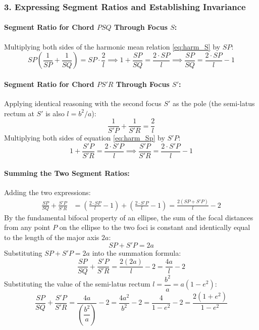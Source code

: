 \documentclass[11pt,a4paper]{article}
\begin{document}
\clearpage
\subsubsection*{3. Expressing Segment Ratios and Establishing Invariance}

\paragraph{Segment Ratio for Chord $PSQ$ Through Focus $S$:}
Multiplying both sides of the harmonic mean relation \eqref{eq:harm_S} by $SP$:
\[
SP \left(\frac{1}{SP} + \frac{1}{SQ}\right) = SP \cdot \frac{2}{l} \implies 1 + \frac{SP}{SQ} = \frac{2 \cdot SP}{l} \implies \frac{SP}{SQ} = \frac{2 \cdot SP}{l} - 1
\]

\paragraph{Segment Ratio for Chord $PS'R$ Through Focus $S'$:}
Applying identical reasoning with the second focus $S'$ as the pole (the semi-latus rectum at $S'$ is also $l = b^2/a$):
\begin{equation}\label{eq:harm_Sp}
\frac{1}{S'P} + \frac{1}{S'R} = \frac{2}{l}
\end{equation}
Multiplying both sides of equation \eqref{eq:harm_Sp} by $S'P$:
\[
1 + \frac{S'P}{S'R} = \frac{2 \cdot S'P}{l} \implies \frac{S'P}{S'R} = \frac{2 \cdot S'P}{l} - 1
\]

\paragraph{Summing the Two Segment Ratios:}
Adding the two expressions:
\begin{align*}
\frac{SP}{SQ} + \frac{S'P}{S'R} &= \left(\frac{2 \cdot SP}{l} - 1\right) + \left(\frac{2 \cdot S'P}{l} - 1\right) = \frac{2(SP + S'P)}{l} - 2
\end{align*}
By the fundamental bifocal property of an ellipse, the sum of the focal distances from any point $P$ on the ellipse to the two foci is constant and identically equal to the length of the major axis $2a$:
\[
SP + S'P = 2a
\]
Substituting $SP + S'P = 2a$ into the summation formula:
\[
\frac{SP}{SQ} + \frac{S'P}{S'R} = \frac{2(2a)}{l} - 2 = \frac{4a}{l} - 2
\]
Substituting the value of the semi-latus rectum $l = \dfrac{b^2}{a} = a(1 - e^2)$:
\[
\frac{SP}{SQ} + \frac{S'P}{S'R} = \frac{4a}{\left(\dfrac{b^2}{a}\right)} - 2 = \frac{4a^2}{b^2} - 2 = \frac{4}{1 - e^2} - 2 = \frac{2(1 + e^2)}{1 - e^2}
\]
\end{document}
